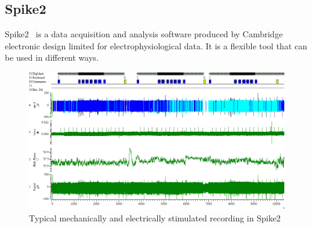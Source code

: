 \subsection{Spike2}
Spike2~\cite{spike2} is a data acquisition and analysis software produced by Cambridge electronic design limited for electrophysiological data. It is a flexible tool that can be used in different ways.

\begin{figure}
	\includegraphics[width = \textwidth]{src/pic/Spike2_screenshot}
	\caption{Typical mechanically and electrically stimulated recording in Spike2}
	\label{fig:spike2}
\end{figure}

